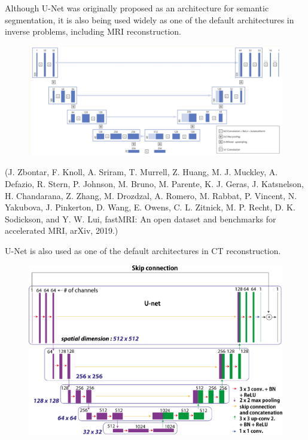 \documentclass{report}
\begin{document}
\begin{concept}
    Although U-Net was originally proposed as an architecture for semantic segmentation, it is also being used widely as one of the default architectures in inverse problems, including MRI reconstruction.

    \begin{figure}[H]
        \centering
        \includegraphics[width=1.0\textwidth]{.././assets/8.27.jpg}
    \end{figure}

    (J. Zbontar, F. Knoll, A. Sriram, T. Murrell, Z. Huang, M. J. Muckley, A. Defazio, R. Stern, P. Johnson, M. Bruno, M. Parente, K. J. Geras, J. Katsnelson, H. Chandarana, Z. Zhang, M. Drozdzal, A. Romero, M. Rabbat, P. Vincent, N. Yakubova, J. Pinkerton, D. Wang, E. Owens, C. L. Zitnick, M. P. Recht, D. K. Sodickson, and Y. W. Lui, fastMRI: An open dataset and benchmarks for accelerated MRI, arXiv, 2019.)

    \par\noindent\textcolor{gray}{\hdashrule{\textwidth}{0.4pt}{1pt 2pt}}

    U-Net is also used as one of the default architectures in CT reconstruction.

    \begin{figure}[H]
        \centering
        \includegraphics[width=1.0\textwidth]{.././assets/8.28.png}
    \end{figure}


\end{concept}
\end{document}
